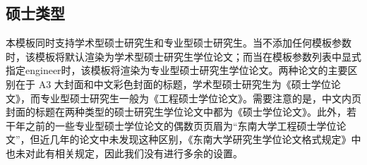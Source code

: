 \subsection{硕士类型}

本模板同时支持学术型硕士研究生和专业型硕士研究生。当不添加任何模板参数时，该模板将默认渲染为学术型硕士研究生学位论文；而当在模板参数列表中显式指定{\codefont engineer}时，该模板将渲染为专业型硕士研究生学位论文。两种论文的主要区别在于 A3 大封面和中文彩色封面的标题，学术型硕士研究生为《硕士学位论文》，而专业型硕士研究生一般为《工程硕士学位论文》。需要注意的是，中文内页封面的标题在两种类型的硕士研究生学位论文中都为《硕士学位论文》。此外，若干年之前的一些专业型硕士学位论文的偶数页页眉为“东南大学工程硕士学位论文”，但近几年的论文中未发现这种区别，《东南大学研究生学位论文格式规定》中也未对此有相关规定，因此我们没有进行多余的设置。